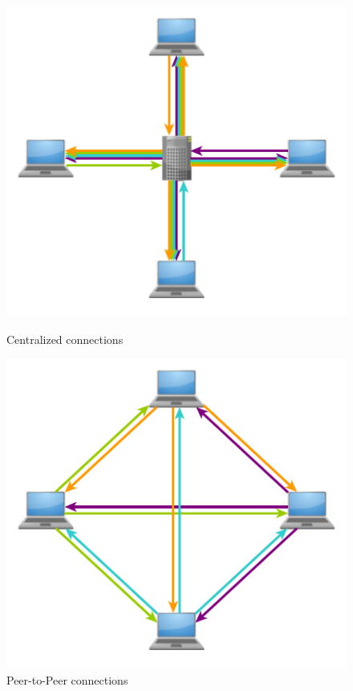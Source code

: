\begin{figure}
\centering
\begin{minipage}[b]{0.45\linewidth}
	\centering
	\includegraphics[width=\textwidth]{figures/ccomposite.pdf}
	\caption{Centralized connections}
	\label{fig:central}
\end{minipage}
\quad
\begin{minipage}[b]{0.45\linewidth}
	\centering
	\includegraphics[width=\textwidth]{figures/dcomposite.pdf}
	\caption{Peer-to-Peer connections}
	\label{fig:p2p}
\end{minipage}
\end{figure}


